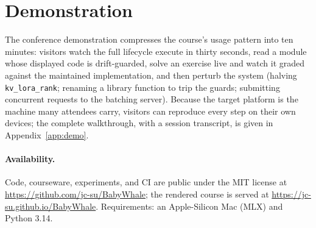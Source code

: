 \section{Demonstration}
\label{sec:demo}

The conference demonstration compresses the course's usage pattern into ten
minutes: visitors watch the full lifecycle execute in thirty seconds, read a
module whose displayed code is drift-guarded, solve an exercise live and watch
it graded against the maintained implementation, and then perturb the system
(halving \texttt{kv\_lora\_rank}; renaming a library function to trip the
guards; submitting concurrent requests to the batching server). Because the
target platform is the machine many attendees carry, visitors can reproduce
every step on their own devices; the complete walkthrough, with a session
transcript, is given in Appendix~\ref{app:demo}.

\paragraph{Availability.} Code, courseware, experiments, and CI are public
under the MIT license at \url{https://github.com/jc-su/BabyWhale}; the
rendered course is served at \url{https://jc-su.github.io/BabyWhale}.
Requirements: an Apple-Silicon Mac (MLX) and Python 3.14.

